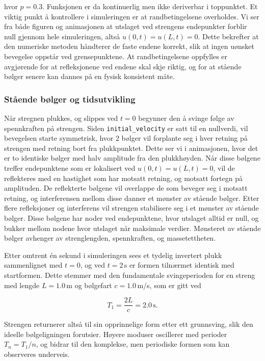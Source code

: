 hvor $p=0.3$. Funksjonen er da kontinuerlig men ikke deriverbar i toppunktet. 
\clearpage
Et viktig punkt å kontrollere i simuleringen er at randbetingelsene overholdes. 
Vi ser fra både figuren og animasjonen at utslaget ved strengens endepunkter forblir null gjennom hele simuleringen, altså $u(0,t)=u(L,t)=0$. 
Dette bekrefter at den numeriske metoden håndterer de faste endene korrekt, slik at ingen uønsket bevegelse oppstår ved grensepunktene. 
At randbetingelsene oppfylles er avgjørende for at refleksjonene ved endene skal skje riktig, og for at stående bølger senere kan dannes på en fysisk konsistent måte.

\subsubsection{Stående bølger og tidsutvikling}
Når stregnen plukkes, og slippes ved $t=0$ begynner den å svinge følge av spennkraften på strengen. Siden \verb|initial_velocity| er satt til en nullverdi, vil bevegelsen starte 
symmetrisk, hvor 2 bølger vil forplante seg i hver retning på strengen med retning bort fra plukkpunktet. Dette ser vi i animasjonen, hvor det er to identiske bølger med halv 
amplitude fra den plukkhøyden. Når disse bølgene treffer endepunktene som er lokalisert ved $u(0,t)=u(L,t)=0$, vil de reflekteres med en hastighet som har motsatt retning, og 
motsatt fortegn på amplituden. De reflekterte bølgene vil overlappe de som beveger seg i motsatt retning, og interferensen mellom disse danner et mønster av stående bølger.
Etter flere refleksjoner og interferens vil strengen stabilisere seg i et mønster av stående bølger. Disse bølgene har noder ved endepunktene, hvor utslaget alltid er null, og
bukker mellom nodene hvor utslaget når maksimale verdier. Mønsteret av stående bølger avhenger av strenglengden, spennkraften, og massetettheten.

Etter omtrent én sekund i simuleringen sees et tydelig invertert plukk sammenlignet med $t=0$, og ved $t=2$\,s er formen tilnærmet identisk med startformen. 
Dette stemmer med den fundamentale svingeperioden for en streng med lengde $L=1.0$\,m og bølgefart $c=1.0$\,m/s, som er gitt ved

\begin{equation*}
T_1 = \frac{2L}{c} = 2.0\,\text{s}.
\end{equation*}

Strengen returnerer altså til sin opprinnelige form etter ett grunnsving, slik den ideelle bølgeligningen forutsier. 
Høyere moduser oscillerer med perioder $T_n = T_1/n$, og bidrar til den komplekse, men periodiske formen som kan observeres underveis.


